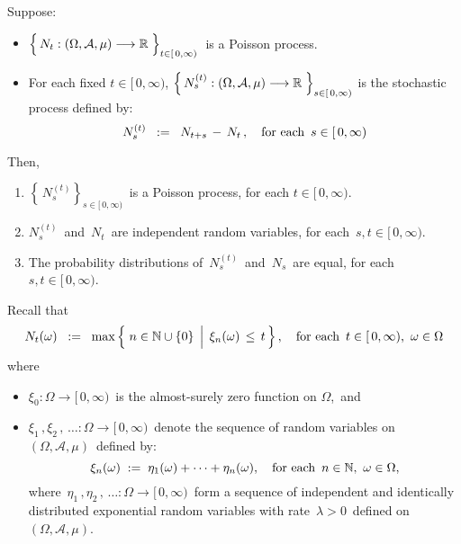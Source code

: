 \vskip 0.5cm
\begin{theorem}
\mbox{}
\vskip 0.15cm
\noindent
Suppose:
\begin{itemize}
\item
	$\left\{\,N_{t} : (\Omega,\mathcal{A},\mu) \overset{{\color{white}-}}{\longrightarrow} \Re \;\right\}_{t \in [\,0,\infty)}$\,
	is a Poisson process.
\item
	For each fixed $t \in [\,0,\infty)$,
	$\left\{\,N^{(t)}_{s} : (\Omega,\mathcal{A},\mu) \overset{{\color{white}-}}{\longrightarrow} \Re \;\right\}_{s \in [\,0,\infty)}$\;
	is the stochastic process defined by:
	\begin{equation*}
	N^{(t)}_{s} \;\; := \;\; N_{t+s} \,-\, N_{t}\,,
	\quad
	\textnormal{for each \,$s \in [\,0,\infty)$}
	\end{equation*}
\end{itemize}
Then,
\begin{enumerate}
\item
	$\left\{\,N^{(t)}_{s}\right\}_{s \in [\,0,\infty)}$\, is a Poisson process, for each $t \in [\,0,\infty)$.
\item
	$N^{(t)}_{s}$\, and \,$N_{t}$\, are independent random variables, for each \,$s, t \in [\,0,\infty)$.
\item
	The probability distributions of \,$N^{(t)}_{s}$\, and \,$N_{s}$\, are equal, for each \,$s, t \in [\,0,\infty)$.
\end{enumerate}
\end{theorem}
\proof
Recall that
\begin{equation*}
N_{t}(\omega)
\;\; := \;\;
	\max\left\{\,\left.
		n \overset{{\color{white}.}}{\in} \N\cup\{0\}
		\,\;\right\vert\;
		\xi_{n}(\omega) \,\leq\, t
		\,\right\},
\quad
\textnormal{for each \,$t \in [\,0,\infty)$,\, $\omega \in \Omega$}
\end{equation*}
where
\begin{itemize}
\item
	$\xi_{0} : \Omega \longrightarrow [\,0,\infty)$\, is the almost-surely zero function on $\Omega$,\,
and
\item
	$\xi_{1}\,, \xi_{2}\,, \,\ldots : \Omega \longrightarrow [\,0,\infty)$\,
	denote the sequence of random variables on
	\,$(\Omega,\mathcal{A},\mu)$\, defined by:
	\begin{equation*}
	\xi_{n}(\omega) \; := \; \eta_{1}(\omega) + \cdots + \eta_{n}(\omega),
	\quad
	\textnormal{for each \,$n \in \mathbb{N}$,\, $\omega \in \Omega$},
	\end{equation*}
	where
	\,$\eta_{1}\,, \eta_{2}\,, \,\ldots : \Omega \longrightarrow [\,0,\infty)$\,
	form a sequence of independent and identically distributed
	exponential random variables with rate \,$\lambda > 0$\,
	defined on \,$(\Omega,\mathcal{A},\mu)$.
\end{itemize}
